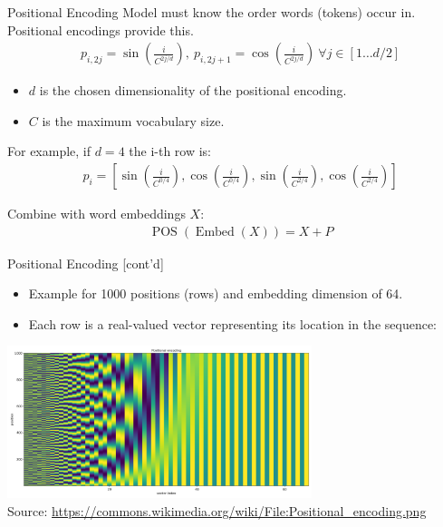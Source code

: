 \documentclass[ignorenonframetext,xcolor=x11names]{beamer}
\begin{document}
\begin{frame}{Positional Encoding}
Model must know the order words (tokens) occur in. Positional encodings provide this. 
\begin{align*}
&p_{i, 2j} = \sin \left( \frac{i}{C^{2j/d}} \right), \ p_{i, 2j+1} = \cos \left( \frac{i}{C^{2j/d}} \right) \ \forall j \in [1 \ldots d/2]
\end{align*}
\begin{itemize}
\item $d$ is the chosen dimensionality of the positional encoding.
\item $C$ is the maximum vocabulary size.
\end{itemize}

For example, if $d=4$ the i-th row is:
\begin{align*}
&p_i = [ \sin(\frac{i}{C^{0/4}}), \cos(\frac{i}{C^{0/4}}), \sin(\frac{i}{C^{2/4}}), \cos(\frac{i}{C^{2/4}}) ]
\end{align*}

Combine with word embeddings $X$:
\begin{align*}
&\operatorname{POS}(\operatorname{Embed}(X)) = X + P
\end{align*}
\end{frame}

\begin{frame}{Positional Encoding \small [cont'd]}
\begin{itemize}
\item Example for 1000 positions (rows) and embedding dimension of 64. 
\item Each row is a real-valued vector representing its location in the sequence:
\end{itemize}
\begin{center}
\includegraphics[height=1.75in]{Positional_encoding.png} \\

\tiny Source: \url{https://commons.wikimedia.org/wiki/File:Positional_encoding.png} \normalsize
\end{center}
\end{frame}
\end{document}
